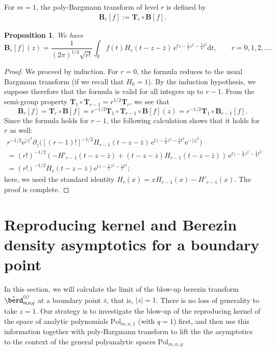 \documentclass{birkart}
\newtheorem{prop}[thm]{Proposition}
\theoremstyle{definition}
\theoremstyle{remark}
\numberwithin{equation}{section}
\numberwithin{figure}{section}
\newcommand{\e}{\mathrm e}
\newcommand{\1}{{\mathbf 1}}
\newcommand{\Rpar}{q}
\newcommand{\R}{{\mathbb R}}
\newcommand{\Tope}{{\mathbf T}}
\newcommand{\Bop}{{\mathbf B}}
\newcommand{\diff}{{\mathrm d}}
\begin{document}
 For $m=1$, the poly-Bargmann 
transform of level $r$ is defined by
\begin{align*}
\Bop_r[f]:= \Tope_r\circ\Bop[f].
\end{align*}

\begin{prop}
\label{prop-Br}
We have
\[ 
\Bop_r[f](z)= 
\frac{1}{(2\pi)^{1/4}\sqrt{r!}} \int_{\R}f(t)H_r(t-z-\bar{z})
\,\e^{tz-\frac12z^2-\frac14t^2} \diff t,\qquad r=0,1,2,\ldots.
\]
\end{prop}
\begin{proof}
We proceed by induction. For $r=0$, the formula reduces to the usual Bargmann
transform (if we recall that $H_0=1$). By the induction hypothesis, we suppose 
therefore that the formula is valid for all integers up to $r-1$. 
From the semi-group property $\Tope_1\circ\Tope_{r-1}=r^{1/2}\Tope_r$, 
we see that   
\[ 
\Bop_r[f]=\Tope_r\circ\Bop[f]=
r^{-1/2}\Tope_1\circ\Tope_{r-1}\circ\Bop[f](z)= 
r^{-1/2}\Tope_1\circ\Bop_{r-1}[f].
\]
Since the formula holds for $r-1$, the following calculation shows that it
holds for $r$ as well:
\begin{multline*}
r^{-1/2}\e^{|z|^2} 
\partial_z 
\bigg([(r-1)!]^{-1/2}H_{r-1}(t-z- \bar{z})
\,\e^{tz-\frac12z^2-\frac14t^2}\e^{-|z|^2}\bigg)  
\\
= (r!)^{-1/2}\left(-H'_{r-1}(t-z-\bar{z})+ 
(t-z- \overline{z})H_{r-1}(t-z-\bar{z}) \right)
\,\e^{tz-\frac12z^2-\frac14t^2}
\\
= (r!)^{-1/2} H_r(t-z-\bar{z})\e^{tz-\frac12z^2-\frac14t^2}; 
\end{multline*}
here, we used the standard identity $H_{r}(x)=xH_{r-1}(x)-H'_{r-1}(x)$. 
The proof is complete. 
\end{proof}

\section{Reproducing kernel and Berezin density asymptotics for a boundary 
point}

In this section, we will calculate the limit of the blow-up berezin transform 
$\hat{\berd}^{\langle z\rangle}_{m,n,\Rpar}$ at a boundary point $z$, 
that is, $|z|=1$. 
There is no loss of generality to take $z=1$. 
Our strategy is to investigate the blow-up of the reproducing kernel of 
the space of analytic polynomials $\mathrm{Pol}_{m,n,1}$ (with $q=1$) first, 
and then use this information together with poly-Bargmann transform to lift the
the asymptotics to the context of the general polyanalytic spaces 
$\mathrm{Pol}_{m,n,\Rpar}$. 
\medskip
\end{document}
